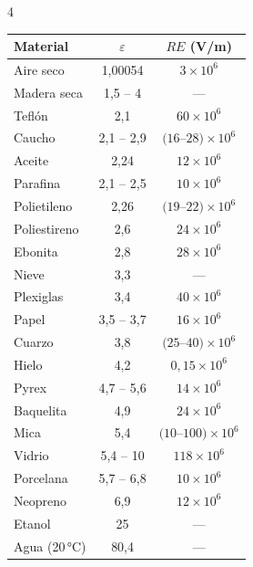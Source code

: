 \documentclass[9pt, landscape, letterpaper]{extarticle}
\begin{document}
\begin{multicols}{4}
  \begin{tablabox}
    \tablacompacta
    \begin{tabular}{@{}lcc@{}}
      \toprule
      Material      & $\varepsilon$ & $RE$ (V/m)                \\
      \midrule
      Aire seco     & 1,00054       & $3 \times 10^6$           \\
      Madera seca   & 1,5 -- 4      & ---                       \\
      Teflón        & 2,1           & $60 \times 10^6$          \\
      Caucho        & 2,1 -- 2,9    & $(16$--$28) \times 10^6$  \\
      Aceite        & 2,24          & $12 \times 10^6$          \\
      Parafina      & 2,1 -- 2,5    & $10 \times 10^6$          \\
      Polietileno   & 2,26          & $(19$--$22) \times 10^6$  \\
      Poliestireno  & 2,6           & $24 \times 10^6$          \\
      Ebonita       & 2,8           & $28 \times 10^6$          \\
      Nieve         & 3,3           & ---                       \\
      Plexiglas     & 3,4           & $40 \times 10^6$          \\
      Papel         & 3,5 -- 3,7    & $16 \times 10^6$          \\
      Cuarzo        & 3,8           & $(25$--$40) \times 10^6$  \\
      Hielo         & 4,2           & $0{,}15 \times 10^6$      \\
      Pyrex         & 4,7 -- 5,6    & $14 \times 10^6$          \\
      Baquelita     & 4,9           & $24 \times 10^6$          \\
      Mica          & 5,4           & $(10$--$100) \times 10^6$ \\
      Vidrio        & 5,4 -- 10     & $118 \times 10^6$         \\
      Porcelana     & 5,7 -- 6,8    & $10 \times 10^6$          \\
      Neopreno      & 6,9           & $12 \times 10^6$          \\
      Etanol        & 25            & ---                       \\
      Agua (20\,°C) & 80,4          & ---                       \\
      \bottomrule
    \end{tabular}
  \end{tablabox}


\end{multicols}
\end{document}
